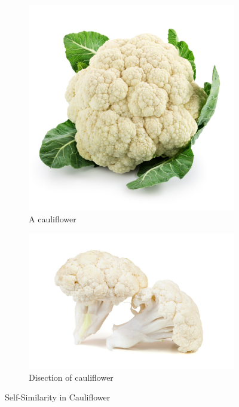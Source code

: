 \begin{figure}
	\centering
	\begin{subfigure}{.8\textwidth}
		\includegraphics[width=\linewidth]{self-similarity/cauliflower.jpg}
		\caption{A cauliflower}
	\end{subfigure}
	\begin{subfigure}{.8\textwidth}
		\includegraphics[width=\linewidth]{self-similarity/cauliflower_disected}
		\caption{Disection of cauliflower}
	\end{subfigure}
	\caption{Self-Similarity in Cauliflower}
	\label{fig:cauliflower-self-similarity}
\end{figure}

